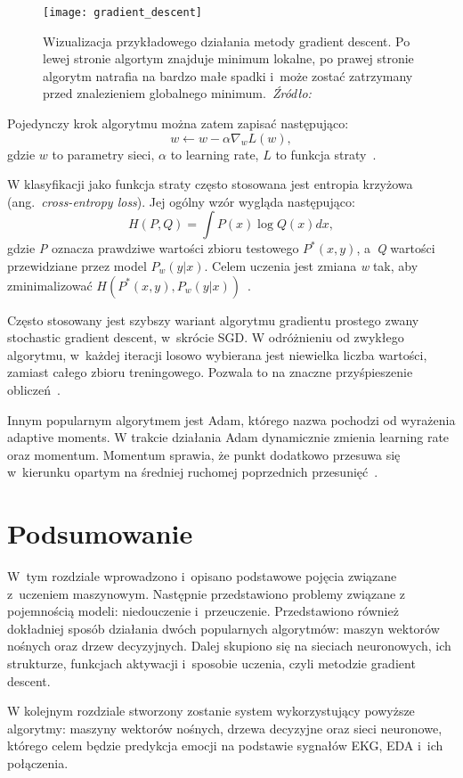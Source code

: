 \begin{figure}[h]
    \centering
    \texttt{[image: gradient\_descent]}
    \caption{Wizualizacja przykładowego działania metody gradient descent. Po lewej stronie algortym znajduje minimum lokalne, po prawej stronie algorytm natrafia na bardzo małe spadki i~może zostać zatrzymany przed znalezieniem globalnego minimum.~\textit{Źródło:~\cite{Geron2019}}}
    \label{fig:gradient-descent}
\end{figure}

Pojedynczy krok algorytmu można zatem zapisać następująco:
\[w \leftarrow w - \alpha \nabla_{w} L(w),\]
gdzie \(w\) to parametry sieci, \(\alpha\) to learning rate, \(L\) to funkcja straty~\cite{Russell2020}.

W klasyfikacji jako funkcja straty często stosowana jest entropia krzyżowa (ang.~\textit{cross-entropy loss}).
Jej ogólny wzór wygląda następująco:
\[H(P,Q) = \int P(x) \log Q(x)dx,\]
gdzie \textit{P} oznacza prawdziwe wartości zbioru testowego \textit{\(P^*(x, y)\)}, a~\textit{Q} wartości przewidziane przez model \textit{\(P_w(y | x)\)}.
Celem uczenia jest zmiana \textit{w} tak, aby zminimalizować \(H(P^*(x, y),P_w(y | x))\)~\cite{Russell2020}.

Często stosowany jest szybszy wariant algorytmu gradientu prostego zwany stochastic gradient descent, w~skrócie SGD\@.
W odróżnieniu od zwykłego algorytmu, w~każdej iteracji losowo wybierana jest niewielka liczba wartości, zamiast całego zbioru treningowego.
Pozwala to na znaczne przyśpieszenie obliczeń~\cite{Russell2020}.

Innym popularnym algorytmem jest Adam, którego nazwa pochodzi od wyrażenia adaptive moments.
W trakcie działania Adam dynamicznie zmienia learning rate oraz momentum.
Momentum sprawia, że punkt dodatkowo przesuwa się w~kierunku opartym na średniej ruchomej poprzednich przesunięć~\cite{Goodfellow2016}.

\section{Podsumowanie}\label{sec:podsumowanie2}

W~tym rozdziale wprowadzono i~opisano podstawowe pojęcia związane z~uczeniem maszynowym.
Następnie przedstawiono problemy związane z pojemnością modeli: niedouczenie i~przeuczenie.
Przedstawiono również dokładniej sposób działania dwóch popularnych algorytmów: maszyn wektorów nośnych oraz drzew decyzyjnych.
Dalej skupiono się na sieciach neuronowych, ich strukturze, funkcjach aktywacji i~sposobie uczenia, czyli metodzie gradient descent.

W kolejnym rozdziale stworzony zostanie system wykorzystujący powyższe algorytmy: maszyny wektorów nośnych, drzewa decyzyjne oraz sieci neuronowe, którego celem będzie predykcja emocji na podstawie sygnałów EKG, EDA i~ich połączenia.

